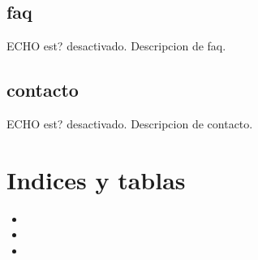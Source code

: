 \documentclass[letterpaper,10pt,spanish]{sphinxmanual}
\begin{document}
\sphinxstepscope


\section{faq}
\label{\detokenize{faq:faq}}\label{\detokenize{faq::doc}}
\sphinxAtStartPar
ECHO est? desactivado.
Descripcion de faq.

\sphinxstepscope


\section{contacto}
\label{\detokenize{contacto:contacto}}\label{\detokenize{contacto::doc}}
\sphinxAtStartPar
ECHO est? desactivado.
Descripcion de contacto.


\chapter{Indices y tablas}
\label{\detokenize{index:indices-y-tablas}}\begin{itemize}
\item {} 
\sphinxAtStartPar
{}

\item {} 
\sphinxAtStartPar
{}

\item {} 
\sphinxAtStartPar
{}

\end{itemize}



\renewcommand{\indexname}{Índice}
\printindex
\end{document}
